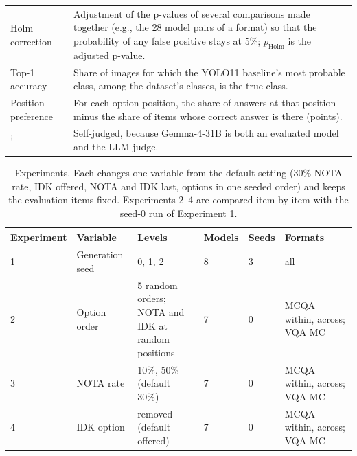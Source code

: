 \documentclass[10pt,letterpaper]{article}
\newcommand{\tablefont}{\footnotesize}
\begin{document}
\begin{table}[!tbp]
\begin{tabular}{p{3.3cm} p{12.2cm}}
Holm correction & Adjustment of the p-values of several comparisons made together (e.g., the 28 model pairs of a format) so that the probability of any false positive stays at 5\%; $p_{\text{Holm}}$ is the adjusted p-value. \\
Top-1 accuracy & Share of images for which the YOLO11 baseline's most probable class, among the dataset's classes, is the true class. \\
Position preference & For each option position, the share of answers at that position minus the share of items whose correct answer is there (points). \\
$^\dagger$ & Self-judged, because Gemma-4-31B is both an evaluated model and the LLM judge. \\
\bottomrule
\end{tabular}
\end{table}

\begin{table}[!tbp]
\centering
\caption{Experiments. Each changes one variable from the default setting (30\% NOTA rate, IDK offered, NOTA and IDK last, options in one seeded order) and keeps the evaluation items fixed. Experiments 2--4 are compared item by item with the seed-0 run of Experiment 1.}
\label{tab:experiments}
\renewcommand{\arraystretch}{1.2}
\tablefont
\begin{tabular}{llllll}
\toprule
\textbf{Experiment} & \textbf{Variable} & \textbf{Levels} & \textbf{Models} & \textbf{Seeds} & \textbf{Formats} \\
\midrule
1 & Generation seed & 0, 1, 2 & 8 & 3 & all \\
2 & Option order & \makecell[l]{5 random orders; NOTA and\\IDK at random positions} & 7 & 0 & MCQA within, across; VQA MC \\
3 & NOTA rate & 10\%, 50\% (default 30\%) & 7 & 0 & MCQA within, across; VQA MC \\
4 & IDK option & removed (default offered) & 7 & 0 & MCQA within, across; VQA MC \\
\bottomrule
\end{tabular}
\end{table}
\end{document}
